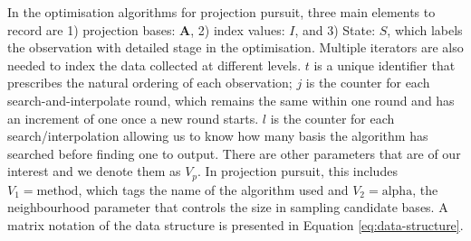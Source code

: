 \documentclass[12pt]{article}
\begin{document}
In the optimisation algorithms for projection pursuit, three main elements to record are 1) projection bases: \(\mathbf{A}\), 2) index values: \(I\), and 3) State: \(S\), which labels the observation with detailed stage in the optimisation. Multiple iterators are also needed to index the data collected at different levels. \(t\) is a unique identifier that prescribes the natural ordering of each observation; \(j\) is the counter for each search-and-interpolate round, which remains the same within one round and has an increment of one once a new round starts. \(l\) is the counter for each search/interpolation allowing us to know how many basis the algorithm has searched before finding one to output. There are other parameters that are of our interest and we denote them as \emph{\(V_{p}\)}. In projection pursuit, this includes \(V_1 = \text{method}\), which tags the name of the algorithm used and \(V_2 = \text{alpha}\), the neighbourhood parameter that controls the size in sampling candidate bases. A matrix notation of the data structure is presented in Equation \ref{eq:data-structure}.
\end{document}
